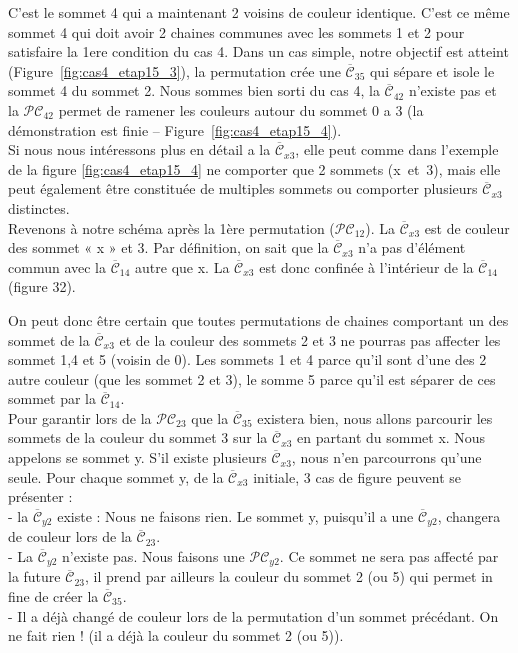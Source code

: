 \begin{description}
C’est le sommet 4 qui a maintenant 2 voisins de couleur identique. C’est ce même sommet 4
qui doit avoir 2 chaines communes avec les sommets 1 et 2 pour satisfaire la 1ere condition du cas 4. 
Dans un cas simple, notre objectif est atteint  (Figure~\ref{fig:cas4_etap15_3}), la permutation crée une $\overline{\mathcal{C}}_{35}$ qui sépare et isole le sommet 4 du sommet 2. Nous sommes bien sorti du cas 4, la $\overline{\mathcal{C}}_{42}$ n’existe pas et la $\mathcal{PC}_{42}$ permet de ramener les couleurs autour du sommet 0 a 3  (la démonstration est finie – Figure~\ref{fig:cas4_etap15_4}).\\

%
%
%
%
Si nous nous intéressons plus en détail a la $\overline{\mathcal{C}}_{x3}$, elle peut comme dans l'exemple de la figure \ref{fig:cas4_etap15_4} ne comporter que 2 sommets (x~et~3), mais elle peut également être constituée de multiples sommets ou comporter plusieurs $\overline{\mathcal{C}}_{x3}$ distinctes.\\

Revenons à notre schéma après la 1ère permutation (${\mathcal{PC}}_{12}$). La $\overline{\mathcal{C}}_{x3}$ est de couleur des sommet « x » et 3. Par définition, on sait que la $\overline{\mathcal{C}}_{x3}$ n’a pas d’élément commun avec la $\overline{\mathcal{C}}_{14}$ autre que x. La $\overline{\mathcal{C}}_{x3}$ est donc confinée à l’intérieur de la $\overline{\mathcal{C}}_{14}$ (figure 32).

On peut donc être certain que toutes permutations de chaines comportant un des sommet de la $\overline{\mathcal{C}}_{x3}$ et de la couleur des sommets 2 et 3 ne pourras pas affecter les sommet 1,4 et 5 (voisin de 0). Les sommets 1 et 4 parce qu’il sont d'une des 2 autre couleur (que les sommet 2 et 3), le somme 5 parce qu’il est séparer de ces sommet par la $\overline{\mathcal{C}}_{14}$.\\

Pour garantir lors de la ${\mathcal{PC}}_{23}$ que la $\overline{\mathcal{C}}_{35}$ existera bien, nous allons parcourir les sommets de la couleur du sommet 3 sur la $\overline{\mathcal{C}}_{x3}$ en partant du sommet x. Nous appelons se sommet y. S'il existe plusieurs $\overline{\mathcal{C}}_{x3}$, nous n'en parcourrons qu'une seule. 
Pour chaque sommet y, de la $\overline{\mathcal{C}}_{x3}$ initiale, 3 cas de figure peuvent se présenter :\\
- la $\overline{\mathcal{C}}_{y2}$ existe : Nous ne faisons rien. Le sommet y, puisqu'il a une $\overline{\mathcal{C}}_{y2}$, changera de couleur lors de la $\overline{\mathcal{C}}_{23}$.\\
- La $\overline{\mathcal{C}}_{y2}$ n'existe pas. Nous faisons une ${\mathcal{PC}}_{y2}$. Ce sommet ne sera pas affecté par la future $\overline{\mathcal{C}}_{23}$, il prend par ailleurs la couleur du sommet 2 (ou 5) qui permet in fine de créer la $\overline{\mathcal{C}}_{35}$.\\
- Il a déjà changé de couleur lors de la permutation d'un sommet précédant. On ne fait rien ! (il a déjà la couleur du sommet 2 (ou 5)).\\



\end{description}
